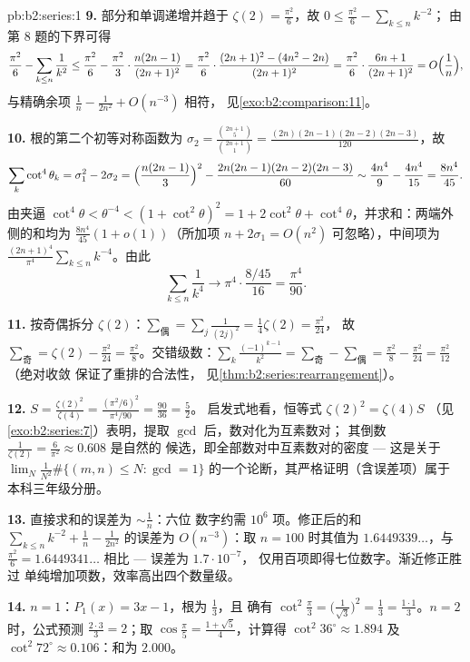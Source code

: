 \begin{solution}{pb:b2:series:1}
\textbf{9.} 部分和单调递增并趋于 $\zeta(2) =
\frac{\pi^2}6$，故 $0 \leq \frac{\pi^2}6 - \sum_{k\leq n}k^{-2}$；
由第 8 题的下界可得
\[
\frac{\pi^2}6 - \sum_{k\leq n}\frac1{k^2}
\leq \frac{\pi^2}6 - \frac{\pi^2}3\cdot\frac{n(2n-1)}{(2n+1)^2}
= \frac{\pi^2}6\cdot\frac{(2n+1)^2 - (4n^2 -
2n)}{(2n+1)^2}
= \frac{\pi^2}6\cdot\frac{6n + 1}{(2n+1)^2}
= O\Bigl(\frac1n\Bigr),
\]
与精确余项 $\frac1n - \frac1{2n^2} + O(n^{-3})$ 相符，
见\cref{exo:b2:comparison:11}。

\textbf{10.} 根的第二个初等对称函数为
$\sigma_2 = \frac{\binom{2n+1}5}{\binom{2n+1}1} =
\frac{(2n)(2n-1)(2n-2)(2n-3)}{120}$，故
\[
\sum_k\cot^4\theta_k = \sigma_1^2 - 2\sigma_2
= \Bigl(\frac{n(2n-1)}3\Bigr)^2 -
\frac{2n(2n-1)(2n-2)(2n-3)}{60}
\sim \frac{4n^4}9 - \frac{4n^4}{15} = \frac{8n^4}{45}.
\]
由夹逼 $\cot^4\theta < \theta^{-4} < (1 + \cot^2\theta)^2 =
1 + 2\cot^2\theta + \cot^4\theta$，并求和：两端外侧的和均为
$\frac{8n^4}{45}(1 + o(1))$（所加项 $n + 2\sigma_1 =
O(n^2)$ 可忽略），中间项为
$\frac{(2n+1)^4}{\pi^4}\sum_{k\leq n}k^{-4}$。由此
\[
\sum_{k\leq n}\frac1{k^4} \longrightarrow
\pi^4\cdot\frac{8/45}{16} = \frac{\pi^4}{90}.
\]

\textbf{11.} 按奇偶拆分 $\zeta(2)$：$\sum_{\text{偶}}
= \sum_j\frac{1}{(2j)^2} = \frac14\zeta(2) = \frac{\pi^2}{24}$，
故 $\sum_{\text{奇}} = \zeta(2) - \frac{\pi^2}{24} =
\frac{\pi^2}8$。交错级数：$\sum_k\frac{(-1)^{k-1}}{k^2} =
\sum_{\text{奇}} - \sum_{\text{偶}} = \frac{\pi^2}8 -
\frac{\pi^2}{24} = \frac{\pi^2}{12}$（绝对收敛
保证了重排的合法性，
见\cref{thm:b2:series:rearrangement}）。

\textbf{12.} $S = \frac{\zeta(2)^2}{\zeta(4)} =
\frac{(\pi^2/6)^2}{\pi^4/90} = \frac{90}{36} = \frac52$。
启发式地看，恒等式 $\zeta(2)^2 = \zeta(4)S$
（见\cref{exo:b2:series:7}）表明，提取 $\gcd$ 后，数对化为互素数对；
其倒数
$\frac1{\zeta(2)} = \frac6{\pi^2} \approx 0.608$ 是自然的
候选，即全部数对中互素数对的密度 ---
这是关于 $\lim_N \frac{1}{N^2}\#\{(m,n) \leq N :
\gcd = 1\}$ 的一个论断，其严格证明（含误差项）属于
本科三年级分册。

\textbf{13.} 直接求和的误差为 $\sim \frac1n$：六位
数字约需 $10^6$ 项。修正后的和
$\sum_{k\leq n}k^{-2} + \frac1n - \frac1{2n^2}$ 的误差为
$O(n^{-3})$：取 $n = 100$ 时其值为 $1.6449339\dots$，与
$\frac{\pi^2}6 = 1.6449341\dots$ 相比 --- 误差为 $1.7\cdot10^{-7}$，
仅用百项即得七位数字。渐近修正胜过
单纯增加项数，效率高出四个数量级。

\textbf{14.} $n = 1$：$P_1(x) = 3x - 1$，根为 $\frac13$，且
确有 $\cot^2\frac\pi3 = \bigl(\frac1{\sqrt3}\bigr)^2 =
\frac13 = \frac{1\cdot1}3$。$n = 2$ 时，公式预测
$\frac{2\cdot3}3 = 2$；取 $\cos\frac\pi5 = \frac{1 +
\sqrt5}{4}$，计算得 $\cot^2 36^\circ \approx 1.894$ 及
$\cot^2 72^\circ \approx 0.106$：和为 $2.000$。


\end{solution}
